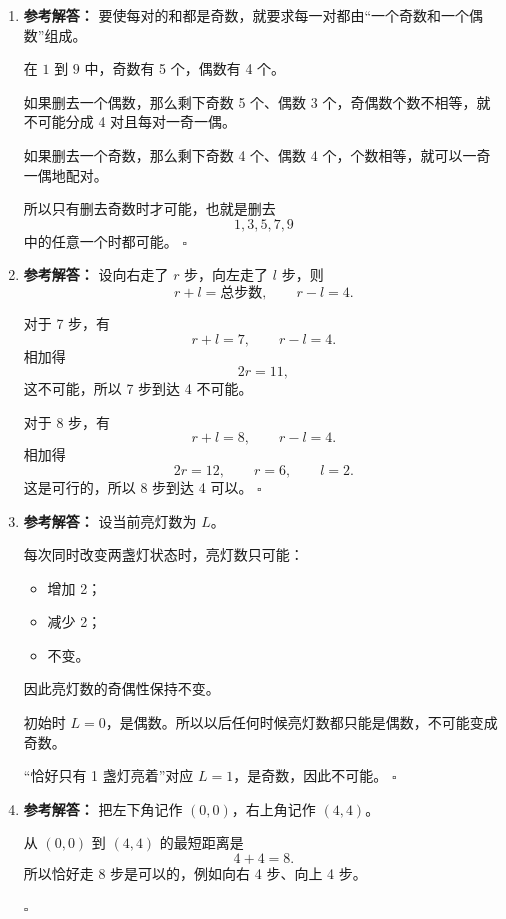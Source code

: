 \documentclass[11pt,a4paper,fontset=fandol]{ctexart}
\newenvironment{solution}{\par\noindent\textbf{参考解答：}}{\hfill$\square$\par}
\begin{document}
\begin{enumerate}
  \item \begin{solution}
  要使每对的和都是奇数，就要求每一对都由“一个奇数和一个偶数”组成。

  在 $1$ 到 $9$ 中，奇数有 5 个，偶数有 4 个。

  如果删去一个偶数，那么剩下奇数 5 个、偶数 3 个，奇偶数个数不相等，就不可能分成 4 对且每对一奇一偶。

  如果删去一个奇数，那么剩下奇数 4 个、偶数 4 个，个数相等，就可以一奇一偶地配对。

  所以只有删去奇数时才可能，也就是删去
  \[
  1,3,5,7,9
  \]
  中的任意一个时都可能。
  \end{solution}

  \item \begin{solution}
  设向右走了 $r$ 步，向左走了 $l$ 步，则
  \[
  r+l=\text{总步数},\qquad r-l=4.
  \]

  对于 7 步，有
  \[
  r+l=7,\qquad r-l=4.
  \]
  相加得
  \[
  2r=11,
  \]
  这不可能，所以 7 步到达 4 不可能。

  对于 8 步，有
  \[
  r+l=8,\qquad r-l=4.
  \]
  相加得
  \[
  2r=12,
  \qquad r=6,
  \qquad l=2.
  \]
  这是可行的，所以 8 步到达 4 可以。
  \end{solution}

  \item \begin{solution}
  设当前亮灯数为 $L$。

  每次同时改变两盏灯状态时，亮灯数只可能：
  \begin{itemize}
    \item 增加 2；
    \item 减少 2；
    \item 不变。
  \end{itemize}

  因此亮灯数的奇偶性保持不变。

  初始时 $L=0$，是偶数。所以以后任何时候亮灯数都只能是偶数，不可能变成奇数。

  “恰好只有 1 盏灯亮着”对应 $L=1$，是奇数，因此不可能。
  \end{solution}

  \item \begin{solution}
  把左下角记作 $(0,0)$，右上角记作 $(4,4)$。

  从 $(0,0)$ 到 $(4,4)$ 的最短距离是
  \[
  4+4=8.
  \]
  所以恰好走 8 步是可以的，例如向右 4 步、向上 4 步。


\end{solution}
\end{enumerate}
\end{document}
